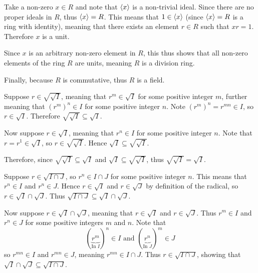 \begin{questions}
\begin{partquestions}{\alph*}
        \item Take a non-zero $x \in R$ and note that $\left\langle x\right\rangle$ is a non-trivial ideal. Since there are no proper ideals in $R$, thus $\left\langle x\right\rangle = R$. This means that $1 \in \left\langle x\right\rangle$ (since $\left\langle x\right\rangle = R$ is a ring with identity), meaning that there exists an element $r \in R$ such that $xr = 1$. Therefore $x$ is a unit.
        
        Since $x$ is an arbitrary non-zero element in $R$, this thus shows that all non-zero elements of the ring $R$ are units, meaning $R$ is a division ring.

        Finally, because $R$ is commutative, thus $R$ is a field.
    \end{partquestions}

    \item \begin{partquestions}{\alph*}
        \item Suppose $r \in \sqrt{\sqrt{I}}$, meaning that $r^m \in \sqrt{I}$ for some positive integer $m$, further meaning that $(r^m)^n \in I$ for some positive integer $n$. Note $(r^m)^n = r^{mn} \in I$, so $r \in \sqrt{I}$. Therefore $\sqrt{\sqrt{I}} \subseteq \sqrt{I}$.
        
        Now suppose $r \in \sqrt{I}$, meaning that $r^n \in I$ for some positive integer $n$. Note that $r = r^1 \in \sqrt{I}$, so $r \in \sqrt{\sqrt{I}}$. Hence $\sqrt{I} \subseteq \sqrt{\sqrt{I}}$.

        Therefore, since $\sqrt{\sqrt{I}} \subseteq \sqrt{I}$ and $\sqrt{I} \subseteq \sqrt{\sqrt{I}}$, thus $\sqrt{\sqrt{I}} = \sqrt{I}$.

        \item Suppose $r \in \sqrt{I\cap J}$, so $r^n \in I \cap J$ for some positive integer $n$. This means that $r^n \in I$ and $r^n \in J$. Hence $r \in \sqrt{I}$ and $r \in \sqrt{J}$ by definition of the radical, so $r \in \sqrt{I}\cap\sqrt{J}$. Thus $\sqrt{I\cap J} \subseteq \sqrt{I}\cap\sqrt{J}$.
        
        Now suppose $r \in \sqrt{I}\cap\sqrt{J}$, meaning that $r \in \sqrt{I}$ and $r \in \sqrt{J}$. Thus $r^m \in I$ and $r^n \in J$ for some positive integers $m$ and $n$. Note that
        \[
            (\underbrace{r^m}_{\text{In }I})^n \in I \text{ and } (\underbrace{r^n}_{\text{In }J})^m \in J
        \]
        so $r^{mn} \in I$ and $r^{mn} \in J$, meaning $r^{mn} \in I \cap J$. Thus $r \in \sqrt{I \cap J}$, showing that $\sqrt{I}\cap\sqrt{J} \subseteq \sqrt{I\cap J}$.


\end{partquestions}
\end{questions}

